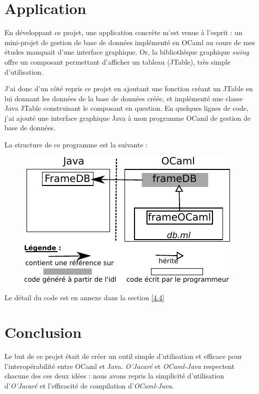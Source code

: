 \documentclass[a4paper, 11pt]{article}
\begin{document}
\section{Application}

En développant ce projet, une application concrète m'est venue à l'esprit : un mini-projet de gestion de base de données implémenté en OCaml au cours de mes études manquait d'une interface graphique. Or, la bibliothèque graphique \emph{swing} offre un composant permettant d'afficher un tableau (JTable), très simple d'utilisation.

J'ai donc d'un côté repris ce projet en ajoutant une fonction créant un JTable en lui donnant les données de la base de données créée, et implémenté une classe Java JTable construisant le composant en question.
En quelques lignes de code, j'ai ajouté une interface graphique Java à mon programme OCaml de gestion de base de données.


La structure de ce programme est la suivante :

\begin{figure}[h!]
  \centering
  \includegraphics{exempleDB.pdf}
\end{figure}

Le détail du code est en annexe dans la section \ref{4.4}


\newpage
\section*{Conclusion}


Le but de ce projet
était de créer un outil simple d'utilisation et efficace pour l'interopérabilité entre OCaml et Java.
\emph{O'Jacaré} et \emph{OCaml-Java} respectent chacune des ces deux
idées : nous avons repris la simplicité d'utilisation
d'\emph{O'Jacaré} et l'efficacité de compilation d'\emph{OCaml-Java}.
\end{document}
